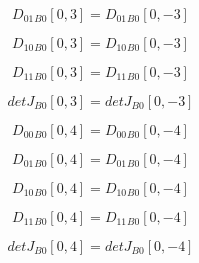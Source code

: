 \documentclass{article}
\begin{document}
\begin{dmath}{D_{01}{_{B0}}}[{0,3}] = {D_{01}{_{B0}}}[{0,-3}]\end{dmath}

\begin{dmath}{D_{10}{_{B0}}}[{0,3}] = {D_{10}{_{B0}}}[{0,-3}]\end{dmath}

\begin{dmath}{D_{11}{_{B0}}}[{0,3}] = {D_{11}{_{B0}}}[{0,-3}]\end{dmath}

\begin{dmath}{detJ{_{B0}}}[{0,3}] = {detJ{_{B0}}}[{0,-3}]\end{dmath}

\begin{dmath}{D_{00}{_{B0}}}[{0,4}] = {D_{00}{_{B0}}}[{0,-4}]\end{dmath}

\begin{dmath}{D_{01}{_{B0}}}[{0,4}] = {D_{01}{_{B0}}}[{0,-4}]\end{dmath}

\begin{dmath}{D_{10}{_{B0}}}[{0,4}] = {D_{10}{_{B0}}}[{0,-4}]\end{dmath}

\begin{dmath}{D_{11}{_{B0}}}[{0,4}] = {D_{11}{_{B0}}}[{0,-4}]\end{dmath}

\begin{dmath}{detJ{_{B0}}}[{0,4}] = {detJ{_{B0}}}[{0,-4}]\end{dmath}
\end{document}
